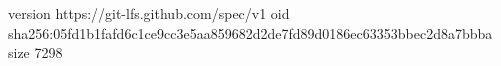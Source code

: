 version https://git-lfs.github.com/spec/v1
oid sha256:05fd1b1fafd6c1ce9cc3e5aa859682d2de7fd89d0186ec63353bbec2d8a7bbba
size 7298
